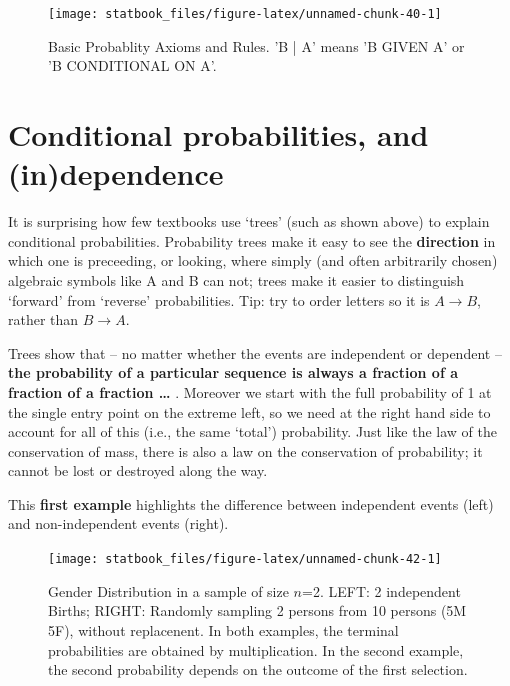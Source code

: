 \documentclass[]{book}
\begin{document}
\begin{figure}

{\centering \texttt{[image: statbook\_files/figure-latex/unnamed-chunk-40-1]} 

}

\caption{Basic Probablity Axioms and Rules. 'B | A' means 'B GIVEN A' or 'B CONDITIONAL ON A'.}\label{fig:unnamed-chunk-40}
\end{figure}

\hypertarget{conditional-probabilities-and-independence}{%
\section{Conditional probabilities, and (in)dependence}\label{conditional-probabilities-and-independence}}

It is surprising how few textbooks use `trees' (such as shown above) to explain conditional probabilities. Probability trees make it easy to see the \textbf{direction} in which one is
preceeding, or looking, where simply (and often arbitrarily chosen) algebraic symbols like A and B can not; trees make it easier
to distinguish `forward' from `reverse' probabilities. Tip: try to order letters so it is \(A\rightarrow B\), rather than \(B\rightarrow A.\)

Trees show that -- no matter whether the events are independent or dependent -- \textbf{the probability of a particular sequence is always a fraction of a fraction of a fraction \ldots{} }. Moreover we start with the full probability of 1 at the single entry point on the extreme left, so we need at the right hand side to account for all of this (i.e., the same `total') probability. Just like the law of the conservation of mass, there is also a law on the conservation of probability; it cannot be lost or destroyed along the way.

This \textbf{first example} highlights the difference between independent events (left) and non-independent events (right).

\begin{figure}

{\centering \texttt{[image: statbook\_files/figure-latex/unnamed-chunk-42-1]} 

}

\caption{Gender Distribution in a sample of size $n$=2. LEFT: 2 independent Births; RIGHT: Randomly sampling 2 persons from 10 persons (5M 5F),  without replacenent. In both examples, the terminal probabilities are obtained by multiplication. In the second example, the second probability  depends on the outcome of the first selection.}\label{fig:unnamed-chunk-42}
\end{figure}
\end{document}
